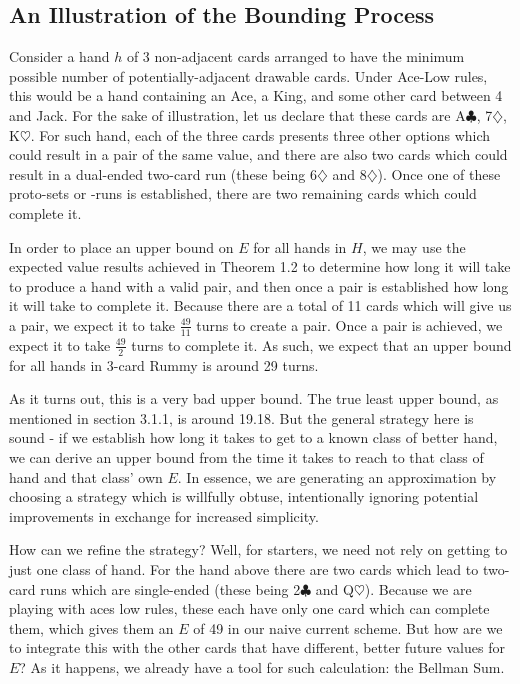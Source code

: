 \documentclass[letter,12pt]{article}
\begin{document}
\subsection{An Illustration of the Bounding Process}

Consider a hand $h$ of 3 non-adjacent cards arranged to have the minimum possible number of potentially-adjacent drawable cards. Under Ace-Low rules, this would be a hand containing an Ace, a King, and some other card between 4 and Jack. For the sake of illustration, let us declare that these cards are A$\clubsuit$, 7$\diamondsuit$, K$\heartsuit$. For such hand, each of the three cards presents three other options which could result in a pair of the same value, and there are also two cards which could result in a dual-ended two-card run (these being 6$\diamondsuit$ and 8$\diamondsuit$). Once one of these proto-sets or -runs is established, there are two remaining cards which could complete it.

In order to place an upper bound on $E$ for all hands in $H$, we may use the expected value results achieved in Theorem 1.2 to determine how long it will take to produce a hand with a valid pair, and then once a pair is established how long it will take to complete it. Because there are a total of 11 cards which will give us a pair, we expect it to take $\frac{49}{11}$ turns to create a pair. Once a pair is achieved, we expect it to take $\frac{49}{2}$ turns to complete it. As such, we expect that an upper bound for all hands in 3-card Rummy is around 29 turns.

As it turns out, this is a very bad upper bound. The true least upper bound, as mentioned in section 3.1.1, is around 19.18. But the general strategy here is sound - if we establish how long it takes to get to a known class of better hand, we can derive an upper bound from the time it takes to reach to that class of hand and that class' own $E$. In essence, we are generating an approximation by choosing a strategy which is willfully obtuse, intentionally ignoring potential improvements in exchange for increased simplicity.

How can we refine the strategy? Well, for starters, we need not rely on getting to just one class of hand. For the hand above there are two cards which lead to two-card runs which are single-ended (these being 2$\clubsuit$ and Q$\heartsuit$). Because we are playing with aces low rules, these each have only one card which can complete them, which gives them an $E$ of 49 in our naive current scheme. But how are we to integrate this with the other cards that have different, better future values for $E$? As it happens, we already have a tool for such calculation: the Bellman Sum.
\end{document}

